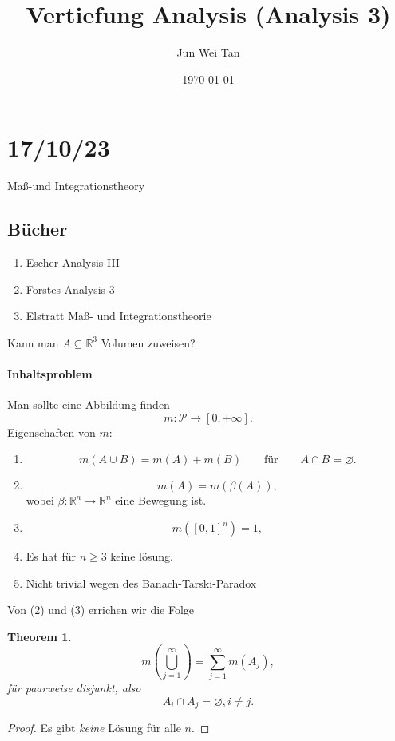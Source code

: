 \documentclass[prb,12pt]{revtex4-2}
\newtheorem{Theorem}{Theorem}
\theoremstyle{definition}
\theoremstyle{definition}
\newcommand{\R}{\mathbb{R}}
\begin{document}
\title{Vertiefung Analysis (Analysis 3)}
\author{Jun Wei Tan}
\date{\today}
\maketitle
\section{17/10/23}
Maß-und Integrationstheory
\subsection{Bücher}
\begin{enumerate}
	\item Escher Analysis III
	\item Forstes Analysis 3
	\item Elstratt Maß- und Integrationstheorie
\end{enumerate}

Kann man $A\subseteq \R^3$ Volumen zuweisen?

\paragraph{Inhaltsproblem} Man sollte eine Abbildung finden
\[
	m:\mathcal{P}\to [0,+\infty]
.\] 
Eigenschaften von $m$:
\begin{enumerate}
	\item \[
			m(A \cup B)=m(A)+m(B)\qquad \text{f\"{u}r}\qquad A\cap B = \varnothing
	.\] 
\item \[
m(A)=m(\beta(A))
,\] 
wobei $\beta: \R^n \to \R^n$ eine Bewegung ist.
\item \[
		m([0,1]^n)=1
,\]
\item Es hat f\"{u}r $n\ge 3$ keine l\"{o}sung.
\item Nicht trivial wegen des Banach-Tarski-Paradox
\end{enumerate}

Von (2) und (3) errichen wir die Folge

\begin{Theorem}
\[
m\left( \bigcup_{j=1}^\infty\right) = \sum_{j=1}^{\infty} m(A_j) 
,\]
f\"{u}r paarweise disjunkt, also
\[
A_i\cap A_j=\varnothing, i\neq j
.\] 
\end{Theorem}
\begin{proof}
	Es gibt \emph{keine} L\"{o}sung f\"{u}r alle $n$.
\end{proof}
\end{document}
